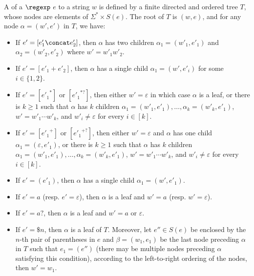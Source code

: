   \begin{definition}
  	A  of a $\regexp$ $e$ to a string $w$ is defined by a finite directed and ordered
  	tree $T$, whose nodes are elements of $\Sigma^{\ast} \times S (e)$. %
  	The  root of $T$ is $(w, e)$, and for any node $\alpha =  	(w', e')$ in $T$, we have:
  	\begin{itemize}
  		\item If $e' = [e'_1 \concat e'_2]$, then $\alpha$ has two children $\alpha_1 = (w'_1,
  		e'_1)$ and $\alpha_2=(w'_2, e'_2)$ where $w' = w'_1 w'_2$.
  		
  		\item If $e' = [e'_1 + e'_2]$, then $\alpha$ has a single child $\alpha_1 = (w',
  		e'_i)$ for some $i \in \{ 1, 2 \}$.
  		
  		\item If $e' = [{e'_1}^{\ast}]$ or $[{e'_1}^{\ast ?}]$, then either $w' = \varepsilon$ in which case $\alpha$ is a
  		leaf, or there is $k \geqslant 1$ such that $\alpha$ has $k$ children $\alpha_1 = (w'_1,
  		e'_1), \ldots, \alpha_k = (w'_k, e'_1)$, $w' = w'_1 \cdots w'_k$, and $w'_i \neq \varepsilon$ for every $i \in [k]$.

  		\item If $e' = [{e'_1}^{+}]$ or $[{e'_1}^{+ ?}]$, then either $w' = \varepsilon$ and $\alpha$ has one child $\alpha_1 = (\varepsilon, e'_1)$, or there is $k \geqslant 1$ such that $\alpha$ has $k$ children $\alpha_1 = (w'_1, e'_1), \ldots, \alpha_k = (w'_k, e'_1)$, $w' = w'_1 \cdots w'_k$, and $w'_i \neq \varepsilon$ for every $i \in [k]$.
%
%		
  		\item If $e' = (e'_1)$, then $\alpha$ has a single child $\alpha_1 = (w', e'_1)$.
  		\item If $e' = a$ (resp. $e' = \varepsilon$), then $\alpha$ is a leaf and
  		$w' = a$ (resp. $w' = \varepsilon$).
%		
  		\item If $e' = a?$, then $\alpha$ is a leaf and
  		$w' = a$ or $\varepsilon$.
%
		\item If $e' = \$n$, then $\alpha$ is a leaf of $T$. 
		Moreover, let $e'' \in S(e)$ be enclosed by the $n$-th pair of parentheses in $e$ and $\beta = (w_1, e_1)$ be the last node preceding $\alpha$ in $T$ such that $e_1 = (e'')$ (there may be multiple nodes preceding $\alpha$ satisfying this condition), 
		according to the left-to-right ordering of the nodes, then $w' = w_1$.
  	\end{itemize}
  	

\end{definition}
